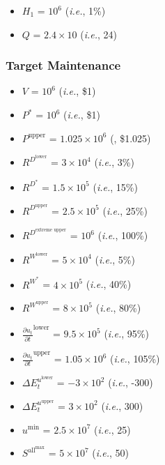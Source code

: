 \documentclass[class=article, crop=false]{standalone}
\begin{document}
\begin{itemize}[topsep=0pt, itemsep=3pt,leftmargin=16pt]
    \item $H_{1}$ = $10^{6}$ (\textit{i.e.}, 1\%)
    \item $Q$ = $2.4 \times 10$ (\textit{i.e.}, 24)
\end{itemize}


\subsubsection{Target Maintenance}

\begin{itemize}[topsep=0pt, itemsep=3pt,leftmargin=16pt]
    \item $V$ = $10^{6}$ (\textit{i.e.}, \$1)
    \item $P^{*}$ = $10^{6}$ (\textit{i.e.}, \$1)
    \item $P^{\text{upper}}$ = $1.025 \times 10^{6}$ (, \$1.025)
    \item $R^{D^{\text{lower}}}$ = $3 \times 10^{4}$ (\textit{i.e.}, 3\%)
    \item $R^{D^{*}}$ = $1.5 \times 10^{5}$ (\textit{i.e.}, 15\%)
    \item $R^{D^{\text{upper}}}$ = $2.5 \times 10^{5}$ (\textit{i.e.}, 25\%)
    \item $R^{D^{\text{extreme upper}}}$ = $10^{6}$ (\textit{i.e.}, 100\%)
    \item $R^{W^{\text{lower}}}$ = $5 \times 10^{4}$ (\textit{i.e.}, 5\%)
    \item $R^{W^{*}}$ = $4 \times 10^{5}$ (\textit{i.e.}, 40\%)
    \item $R^{W^{\text{upper}}}$ = $8 \times 10^{5}$ (\textit{i.e.}, 80\%)
    \item $\frac{\partial u_{t}}{\partial t}^{\text{lower}}$ = $9.5 \times 10^{5}$ (\textit{i.e.}, 95\%)
    \item $\frac{\partial u_{t}}{\partial t}^{\text{upper}}$ = $1.05 \times 10^{6}$ (\textit{i.e.}, 105\%)
    \item $\Delta E_{t}^{u^{\text{lower}}}$ = $-3 \times 10^{2}$ (\textit{i.e.}, -300)
    \item $\Delta E_{t}^{u^{\text{upper}}}$ = $3 \times 10^{2}$ (\textit{i.e.}, 300)
    \item $u^{\text{min}}$ = $2.5 \times 10^{7}$ (\textit{i.e.}, 25)
    \item $S^{\text{all}^{\text{max}}}$ = $5 \times 10^{7}$ (\textit{i.e.}, 50)

\end{itemize}
\end{document}
